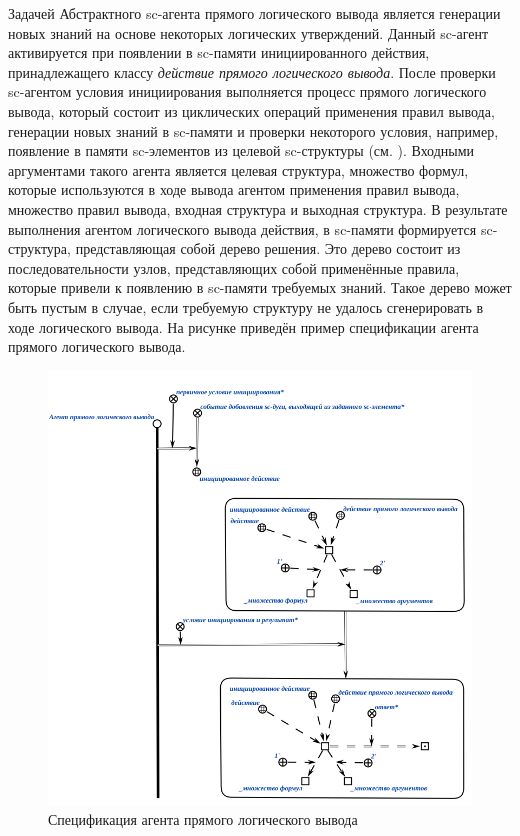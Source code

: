 Задачей Абстрактного sc-агента прямого логического вывода является генерации новых знаний на основе некоторых логических утверждений. Данный sc-агент активируется при появлении в sc-памяти инициированного действия, принадлежащего классу \textit{действие прямого логического вывода}. После проверки sc-агентом условия инициирования выполняется процесс прямого логического вывода, который состоит из циклических операций применения правил вывода, генерации новых знаний в sc-памяти и проверки некоторого условия, например, появление в памяти sc-элементов из целевой sc-структуры (см. ). Входными аргументами такого агента является целевая структура, множество формул, которые используются в ходе вывода агентом применения правил вывода, множество правил вывода, входная структура и выходная структура. В результате выполнения агентом логического вывода действия, в sc-памяти формируется sc-структура, представляющая собой дерево решения. Это дерево состоит из последовательности узлов, представляющих собой применённые правила, которые привели к появлению в sc-памяти требуемых знаний. Такое дерево может быть пустым в случае, если требуемую структуру не удалось сгенерировать в ходе логического вывода. На рисунке  приведён пример спецификации агента прямого логического вывода.

\begin{figure}[http]
	\includegraphics[scale=0.8]{author/part3/figures/direct_inference_agent.png}
	\caption{Спецификация агента прямого логического вывода}
	\label{fig:direct_inference_agent}
\end{figure}

